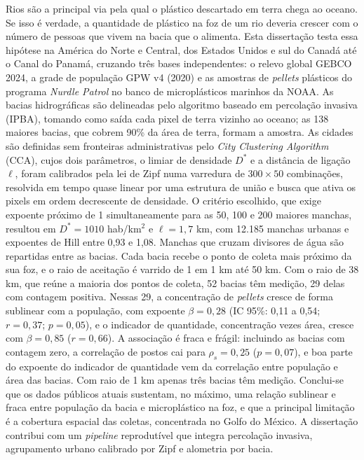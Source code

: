 Rios são a principal via pela qual o plástico descartado em terra chega ao oceano. Se isso é verdade, a quantidade de plástico na foz de um rio deveria crescer com o número de pessoas que vivem na bacia que o alimenta. Esta dissertação testa essa hipótese na América do Norte e Central, dos Estados Unidos e sul do Canadá até o Canal do Panamá, cruzando três bases independentes: o relevo global GEBCO 2024, a grade de população GPW v4 (2020) e as amostras de \textit{pellets} plásticos do programa \textit{Nurdle Patrol} no banco de microplásticos marinhos da NOAA. As bacias hidrográficas são delineadas pelo algoritmo baseado em percolação invasiva (IPBA), tomando como saída cada pixel de terra vizinho ao oceano; as 138 maiores bacias, que cobrem 90\% da área de terra, formam a amostra. As cidades são definidas sem fronteiras administrativas pelo \textit{City Clustering Algorithm} (CCA), cujos dois parâmetros, o limiar de densidade $D^{*}$ e a distância de ligação $\ell$, foram calibrados pela lei de Zipf numa varredura de $300 \times 50$ combinações, resolvida em tempo quase linear por uma estrutura de união e busca que ativa os pixels em ordem decrescente de densidade. O critério escolhido, que exige expoente próximo de 1 simultaneamente para as 50, 100 e 200 maiores manchas, resultou em $D^{*} = 1010$ hab/km$^2$ e $\ell = 1{,}7$ km, com 12.185 manchas urbanas e expoentes de Hill entre 0,93 e 1,08. Manchas que cruzam divisores de água são repartidas entre as bacias. Cada bacia recebe o ponto de coleta mais próximo da sua foz, e o raio de aceitação é varrido de 1 em 1 km até 50 km. Com o raio de 38 km, que reúne a maioria dos pontos de coleta, 52 bacias têm medição, 29 delas com contagem positiva. Nessas 29, a concentração de \textit{pellets} cresce de forma sublinear com a população, com expoente $\beta = 0{,}28$ (IC 95\%: 0,11 a 0,54; $r = 0{,}37$; $p = 0{,}05$), e o indicador de quantidade, concentração vezes área, cresce com $\beta = 0{,}85$ ($r = 0{,}66$). A associação é fraca e frágil: incluindo as bacias com contagem zero, a correlação de postos cai para $\rho_s = 0{,}25$ ($p = 0{,}07$), e boa parte do expoente do indicador de quantidade vem da correlação entre população e área das bacias. Com raio de 1 km apenas três bacias têm medição. Conclui-se que os dados públicos atuais sustentam, no máximo, uma relação sublinear e fraca entre população da bacia e microplástico na foz, e que a principal limitação é a cobertura espacial das coletas, concentrada no Golfo do México. A dissertação contribui com um \textit{pipeline} reprodutível que integra percolação invasiva, agrupamento urbano calibrado por Zipf e alometria por bacia.

